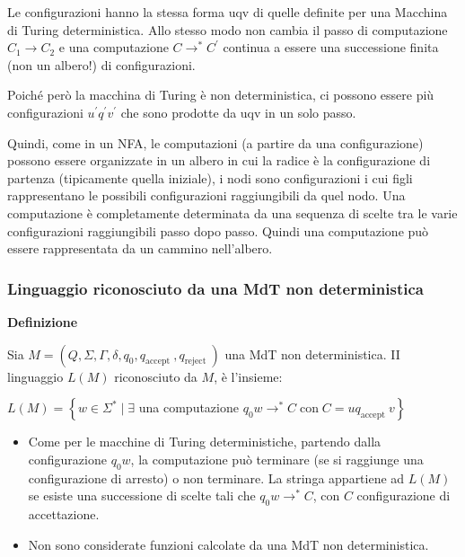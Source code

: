 \vspace{5mm}

Le configurazioni hanno la stessa forma uqv di quelle definite per una Macchina di Turing deterministica.
Allo stesso modo non cambia il passo di computazione $C_{1} \rightarrow C_{2}$ e una computazione $C \rightarrow^{*} C^{\prime}$ continua a essere una successione finita (non un albero!) di configurazioni.

Poiché però la macchina di Turing è non deterministica, ci possono essere più configurazioni $u^{\prime} q^{\prime} v^{\prime}$ che sono prodotte da uqv in un solo passo.

\vspace{5mm}

Quindi, come in un NFA, le computazioni (a partire da una configurazione) possono essere organizzate in un albero in cui la radice è la configurazione di partenza (tipicamente quella iniziale), i nodi sono configurazioni i cui figli rappresentano le possibili configurazioni raggiungibili da quel nodo.
Una computazione è completamente determinata da una sequenza di scelte tra le varie configurazioni raggiungibili passo dopo passo.
Quindi una computazione può essere rappresentata da un cammino nell'albero.

\subsubsection{Linguaggio riconosciuto da una MdT non deterministica}

\textbf{Definizione}

Sia $M=\left(Q, \Sigma, \Gamma, \delta, q_{0}, q_{\text {accept }}, q_{\text {reject }}\right)$ una MdT non deterministica. II linguaggio $L(M)$ riconosciuto da $M$, è l'insieme:


$L(M)=\left\{w \in \Sigma^{*} \mid \exists\right.$ una computazione $\left.q_{0} w \rightarrow^{*} C \operatorname{con} C=u q_{\text {accept }} v\right\}$

\begin{itemize}
    \item Come per le macchine di Turing deterministiche, partendo dalla configurazione $q_{0} w$, la computazione può terminare (se si raggiunge una configurazione di arresto) o non terminare. La stringa appartiene ad $L(M)$ se esiste una successione di scelte tali che $q_{0} w \rightarrow^{*} C$, con $C$ configurazione di accettazione.
    \item Non sono considerate funzioni calcolate da una MdT non deterministica.
\end{itemize}

